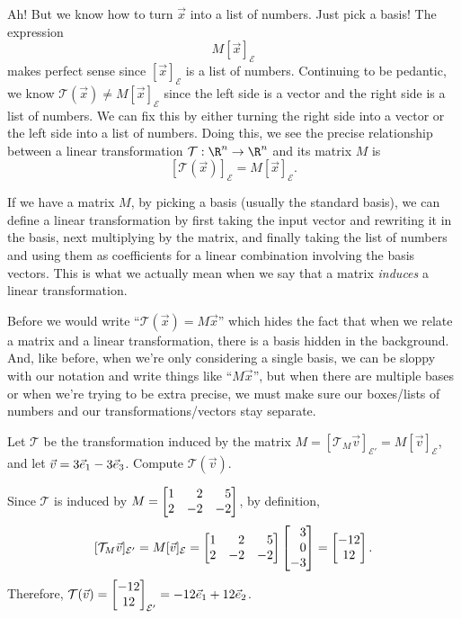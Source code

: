 Ah! But we know how to turn $\vec x$ into a list of numbers. Just pick a basis! The expression
\[
	M[\vec x]_{\mathcal E}
\]
makes perfect sense since $[\vec x]_{\mathcal E}$ is a list of numbers. Continuing to be pedantic, we know
$\mathcal T(\vec x)\neq M[\vec x]_{\mathcal E}$ since the left side is a vector and the right side is a list of numbers.
We can fix this by either turning the right side into a vector or the left side into a list of numbers.
Doing this, we see the precise relationship between a linear transformation $\mathcal T:\R^n\to\R^n$ and its matrix $M$ is
\[
	[\mathcal T(\vec x)]_{\mathcal E}=M[\vec x]_{\mathcal E}.
\]

If we have a matrix $M$, by picking a basis (usually the standard basis),
we can define a linear transformation by first taking the input vector and rewriting it in the basis,
next multiplying by the matrix, and finally taking the list of numbers and using them as coefficients
for a linear combination involving the basis vectors. This is what we actually mean
when we say that a matrix \emph{induces} a linear transformation.


Before we would write ``$\mathcal T(\vec x)=M\vec x$'' which hides the fact that when we relate a matrix and a linear
transformation, there is a basis hidden in the background. And, like before, when we're only considering a single basis,
we can be sloppy with our notation and write things like ``$M\vec x$'', but when there are multiple bases or when we're
trying to be extra precise, we must make sure our boxes/lists of numbers and our transformations/vectors stay separate.

\begin{example}
	Let $\mathcal T$ be the transformation induced by the matrix $M=[\mathcal T_{M}\vec v]_{\mathcal E'}= M[\vec v]_{\mathcal E}$,
	and let $\vec v=3{\vec e_1}-3{\vec e_3}$. Compute $\mathcal T(\vec v)$.

	Since $\mathcal T$ is induced by $M=\mat{1&2&5\\2&-2&-2}$, by definition, 	
	\[
	    [\mathcal T_{M}\vec v]_{\mathcal E'}= M[\vec v]_{\mathcal E}=\mat{1&2&5\\2&-2&-2}\mat{3\\0\\-3}=\matc{-12\\12}.
	\]
	Therefore, $\mathcal T(\vec v) = \begin{bmatrix}-12\\12\end{bmatrix}_{\mathcal E'}=-12{\vec e_1}+12{\vec e_2}$.
\end{example}

